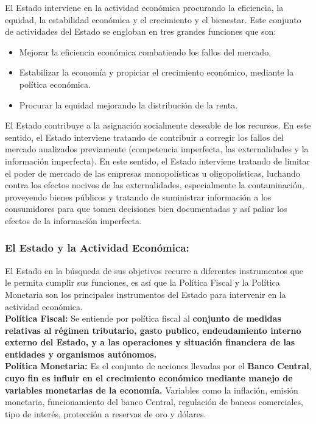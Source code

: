 El Estado interviene en la actividad económica procurando la eficiencia, la equidad, la estabilidad económica y el crecimiento y el bienestar. Este conjunto de actividades del Estado se engloban en tres grandes funciones que son:\\
\begin{itemize}
	\item Mejorar la eficiencia económica combatiendo los
	fallos del mercado.
	\item Estabilizar la economía y propiciar el crecimiento
	económico, mediante la política económica.
	\item Procurar la equidad mejorando la distribución de la
	renta.
\end{itemize}
El Estado contribuye a la asignación socialmente deseable de los recursos. En este sentido, el Estado interviene tratando de contribuir a corregir los fallos del
mercado analizados previamente (competencia imperfecta, las externalidades y la información imperfecta). En este sentido, el Estado interviene tratando de limitar el poder
de mercado de las empresas monopolísticas u oligopolísticas, luchando contra los efectos nocivos de las externalidades, especialmente la contaminación, proveyendo bienes públicos y tratando de suministrar información a los consumidores para que tomen decisiones
bien documentadas y así paliar los efectos de la información imperfecta.\\

\subsubsection{El Estado y la Actividad Económica:}

El Estado en la búsqueda de sus objetivos recurre a diferentes instrumentos que le permita cumplir sus funciones, es así que la Política Fiscal y la Política Monetaria son los principales instrumentos del Estado para intervenir en la actividad económica.\\

	\textbf{\textcolor[rgb]{0,0.24,0.5}{Política Fiscal:}}	\small Se entiende por política fiscal al \textbf{conjunto de medidas relativas al régimen tributario, gasto publico, endeudamiento interno externo del Estado, y a las operaciones y situación financiera de las entidades y organismos autónomos. } \\
	
	\textbf{\textcolor[rgb]{0,0.24,0.5}{Política Monetaria:}} \small Es el conjunto de acciones llevadas por el \textbf{Banco Central}, \textbf{cuyo fin es influir en el crecimiento económico mediante manejo de variables monetarias de la economía.} Variables como la inflación, emisión monetaria, funcionamiento del banco Central, regulación de bancos comerciales, tipo de interés, protección a reservas de oro y dólares.\\
	
